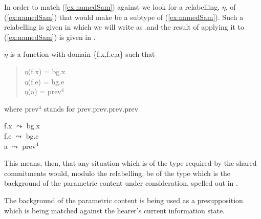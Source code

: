 In order to match (\ref{ex:namedSam})  against \preveg{}  we look
for a relabelling, $\eta$, of (\ref{ex:namedSam}) that would make
\preveg{} be a subtype of (\ref{ex:namedSam}).  Such a
relabelling is given in  which we will write as .and the result of applying it to
(\ref{ex:namedSam}) is given in .
\begin{ex}
\begin{subex}
\item $\eta$ is a function with domain \{f.x,f.e,a\} such that
\begin{quote}
$\eta$(f.x) = bg.x\\
$\eta$(f.e) = bg.e\\
$\eta$(a) = prev$^4$
\end{quote}
where prev$^4$ stands for prev.prev.prev.prev
\item f.x $\leadsto$ bg.x\\
f.e $\leadsto$ bg.e\\
a $\leadsto$ prev$^4$
 
\item 
{}

\end{subex}
\end{ex}
This means, then, that any situation which is of the type required by
the shared commitments would, modulo the relabelling, be of the type
which is the background of the parametric content under consideration,
spelled out in \nexteg{}.
\begin{ex}
 
\end{ex} 
The background of the parametric content is
being used as a presupposition which is being matched against the
hearer's current information state.

